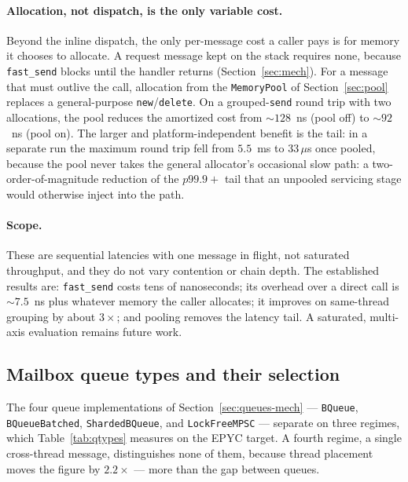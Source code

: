 \documentclass[11pt]{article}
\newcommand{\fs}{\texttt{fast\_send}}
\newcommand{\snd}{\texttt{send}}
\begin{document}
\paragraph{Allocation, not dispatch, is the only variable cost.} Beyond the
inline dispatch, the only per-message cost a caller pays is for memory it chooses
to allocate. A request message kept on the stack requires none, because \fs{}
blocks until the handler returns (Section~\ref{sec:mech}). For a message that must
outlive the call, allocation from the \texttt{MemoryPool} of
Section~\ref{sec:pool} replaces a general-purpose
\texttt{new}/\texttt{delete}. On a grouped-\snd{} round trip with two allocations,
the pool reduces the amortized cost from $\sim\!128$~ns (pool off) to $\sim\!92$~ns
(pool on). The larger and platform-independent benefit is the tail: in a separate
run the maximum round trip fell from $5.5$~ms to $33\,\mu$s once pooled, because
the pool never takes the general allocator's occasional slow path: a
two-order-of-magnitude reduction of the $p99.9{+}$ tail that an unpooled
servicing stage would otherwise inject into the path.

\paragraph{Scope.} These are sequential latencies with one message in flight, not
saturated throughput, and they do not vary contention or chain depth. The
established results are: \fs{} costs tens of nanoseconds; its overhead over a
direct call is $\sim\!7.5$~ns plus whatever memory the caller allocates; it
improves on same-thread grouping by about $3\times$; and pooling removes the
latency tail. A saturated, multi-axis evaluation
remains future work.

\subsection{Mailbox queue types and their selection}
\label{sec:qtypes}

The four queue implementations of Section~\ref{sec:queues-mech} ---
\texttt{BQueue}, \texttt{BQueueBatched}, \texttt{ShardedBQueue}, and
\texttt{LockFreeMPSC} --- separate on three regimes, which
Table~\ref{tab:qtypes} measures on the EPYC target. A fourth regime, a single
cross-thread message, distinguishes none of them, because thread placement moves
the figure by $2.2\times$ --- more than the gap between queues.
\end{document}
